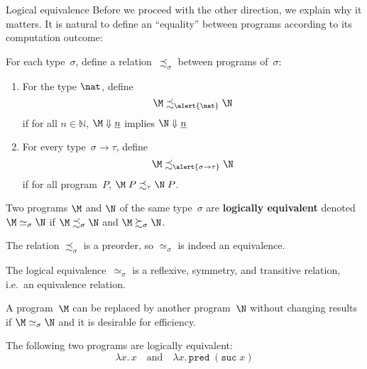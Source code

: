 \begin{frame}{Logical equivalence}
  Before we proceed with the other direction, we explain why it matters.  It is
  natural to define an ``equality'' between programs according to its
  computation outcome:
  \begin{definition}
    For each type~$\sigma$, define a relation~$\precsim_\sigma$ between
    programs of~$\sigma$:
    \begin{enumerate}
      \item For the type $\nat$, define
        \[
          \M \precsim_{\alert{\nat}} \N
        \]
        if for all $n \in \mathbb{N}$, 
          $\M \Downarrow \underline{n}$ implies $\N \Downarrow \underline{n}$
      \item For every type~$\sigma \to \tau$, define
        \[
          \M \precsim_{\alert{\sigma \to\tau}} \N
        \]
          if for all program~$P$,
            $\M\;P \precsim_{\tau} \N\;P$.
    \end{enumerate}
  \end{definition}
    Two programs $\M$ and $\N$ of the same type~$\sigma$ are \textbf{logically
      equivalent} denoted~$\M\simeq_\sigma\N$ if $\M \precsim_\sigma \N$ and
    $\M \succsim_\sigma \N$. 

\end{frame}

\begin{frame}
  The relation $\precsim_\sigma$ is a preorder, so
  $\simeq_\sigma$ is indeed an equivalence.   \begin{proposition}
    The logical equivalence~$\simeq_\sigma$ is a reflexive, symmetry, and transitive
    relation, i.e.\ an equivalence relation.
  \end{proposition}
  A program~$\M$ can be replaced by another program~$\N$ without changing
  results if $\M \simeq_\sigma \N$ and it is desirable for efficiency.
    \begin{example}
      The following two programs are logically equivalent:
      \[
        \lambda x.\, x
        \quad\text{and}\quad
        \lambda x.\, \mathtt{pred}\; (\mathtt{suc}\; x)
      \]
    \end{example}
\end{frame}

